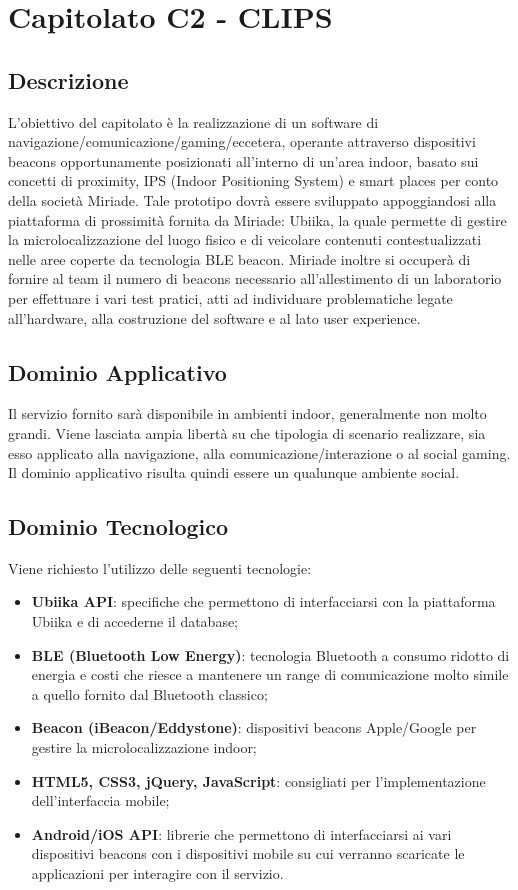 \newpage
\section{Capitolato C2 - CLIPS}
\subsection{Descrizione}
L'obiettivo del capitolato è la realizzazione di un software di navigazione/comunicazione/gaming/eccetera, operante attraverso dispositivi beacons opportunamente posizionati all'interno di un'area indoor, basato sui concetti di proximity, IPS (Indoor Positioning System) e smart places per conto della società Miriade. Tale prototipo dovrà essere sviluppato appoggiandosi alla piattaforma di prossimità fornita da Miriade: Ubiika, la quale permette di gestire la microlocalizzazione del luogo fisico e di veicolare contenuti contestualizzati nelle aree coperte da tecnologia BLE beacon. Miriade inoltre si occuperà di fornire al team il numero di beacons necessario all'allestimento di un laboratorio per effettuare i vari test pratici, atti ad individuare problematiche legate all'hardware, alla costruzione del software e al lato user experience.     

\subsection{Dominio Applicativo}
Il servizio fornito sarà disponibile in ambienti indoor, generalmente non molto grandi. Viene lasciata ampia libertà su che tipologia di scenario realizzare, sia esso applicato alla navigazione, alla comunicazione/interazione o al social gaming. Il dominio applicativo risulta quindi essere un qualunque ambiente social. 

\subsection{Dominio Tecnologico}
Viene richiesto l'utilizzo delle seguenti tecnologie:
\begin{itemize}
\item \textbf{Ubiika API}: specifiche che permettono di interfacciarsi con la piattaforma Ubiika e di accederne il database;
\item \textbf{BLE (Bluetooth Low Energy)}: tecnologia Bluetooth a consumo ridotto di energia e costi che riesce a mantenere un range di comunicazione molto simile a quello fornito dal Bluetooth classico;
\item \textbf{Beacon (iBeacon/Eddystone)}: dispositivi beacons Apple/Google per gestire la microlocalizzazione indoor;
\item \textbf{HTML5, CSS3, jQuery, JavaScript}: consigliati per l'implementazione dell'interfaccia mobile;
\item \textbf{Android/iOS API}: librerie che permettono di interfacciarsi ai vari dispositivi beacons con i dispositivi mobile su cui verranno scaricate le applicazioni per interagire con il servizio.
\end{itemize}


